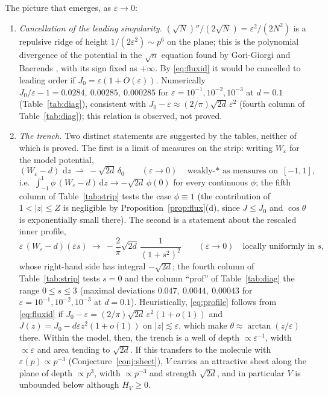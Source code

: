 \documentclass[11pt,a4paper]{article}
\theoremstyle{plain}
\theoremstyle{definition}
\theoremstyle{remark}
\newcommand{\dd}{\,\mathrm{d}}
\begin{document}
The picture that emerges, as $\varepsilon\to0$:
\begin{enumerate}
\item \emph{Cancellation of the leading singularity.} $(\sqrt N)''/(2\sqrt N)=\varepsilon^2/(2N^2)$ is a repulsive ridge of height $1/(2\varepsilon^2)\sim p^6$ on the plane; this is the polynomial divergence of the potential in the $\sqrt n$ equation found by Gori-Giorgi and Baerends \cite{GB18}, with its sign fixed as $+\infty$. By \eqref{eq:fluxid} it would be cancelled to leading order if $J_0=\varepsilon(1+O(\varepsilon))$. Numerically $J_0/\varepsilon-1=0.0284,\ 0.00285,\ 0.000285$ for $\varepsilon=10^{-1},10^{-2},10^{-3}$ at $d=0.1$ (Table~\ref{tab:diag}), consistent with $J_0-\varepsilon\approx(2/\pi)\sqrt{2d}\,\varepsilon^2$ (fourth column of Table~\ref{tab:diag}); this relation is observed, not proved.
\item \emph{The trench.} Two distinct statements are suggested by the tables, neither of which is proved. The first is a limit of measures on the strip: writing $W_\varepsilon$ for the model potential,
\begin{equation}\label{eq:sheet}
(W_\varepsilon-d)\,\dd z\ \rightharpoonup\ -\sqrt{2d}\,\delta_0\qquad(\varepsilon\to0)\quad\text{weakly-$*$ as measures on }[-1,1],
\end{equation}
i.e.\ $\int_{-1}^{1}\phi\,(W_\varepsilon-d)\dd z\to-\sqrt{2d}\,\phi(0)$ for every continuous $\phi$; the fifth column of Table~\ref{tab:strip} tests the case $\phi\equiv1$ (the contribution of $1<|z|\le Z$ is negligible by Proposition~\ref{prop:flux}(d), since $J\le J_0$ and $\cos\theta$ is exponentially small there). The second is a statement about the rescaled inner profile,
\begin{equation}\label{eq:profile}
\varepsilon\,(W_\varepsilon-d)(\varepsilon s)\ \to\ -\frac{2}{\pi}\sqrt{2d}\,\frac{1}{(1+s^2)^2}\qquad(\varepsilon\to0)\quad\text{locally uniformly in }s ,
\end{equation}
whose right-hand side has integral $-\sqrt{2d}$; the fourth column of Table~\ref{tab:strip} tests $s=0$ and the column ``prof'' of Table~\ref{tab:diag} the range $0\le s\le3$ (maximal deviations $0.047,\ 0.0044,\ 0.00043$ for $\varepsilon=10^{-1},10^{-2},10^{-3}$ at $d=0.1$). Heuristically, \eqref{eq:profile} follows from \eqref{eq:fluxid} if $J_0-\varepsilon=(2/\pi)\sqrt{2d}\,\varepsilon^2(1+o(1))$ and $J(z)=J_0-d\varepsilon z^2(1+o(1))$ on $|z|\lesssim\varepsilon$, which make $\theta\approx\arctan(z/\varepsilon)$ there. Within the model, then, the trench is a well of depth $\propto\varepsilon^{-1}$, width $\propto\varepsilon$ and area tending to $\sqrt{2d}$. If this transfers to the molecule with $\varepsilon(p)\propto p^{-3}$ (Conjecture~\ref{conj:sheet}), $V$ carries an attractive sheet along the plane of depth $\propto p^{3}$, width $\propto p^{-3}$ and strength $\sqrt{2d}$, and in particular $V$ is unbounded below although $H_V\ge0$.

\end{enumerate}
\end{document}
